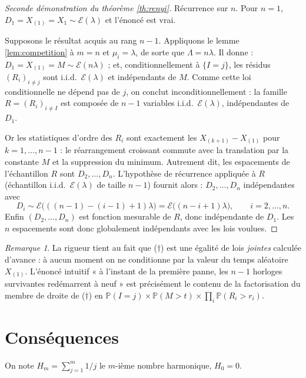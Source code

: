 \documentclass[11pt,a4paper]{article}
\theoremstyle{plain}
\theoremstyle{definition}
\theoremstyle{remark}
\newtheorem{remarque}[theoreme]{Remarque}
\newcommand{\Prob}{\mathbb{P}}
\newcommand{\Expo}{\mathcal{E}}
\newcommand{\Xord}[1]{X_{(#1)}}
\begin{document}
\begin{proof}[Seconde démonstration du théorème \ref{th:renyi}]
Récurrence sur $n$. Pour $n=1$, $D_1=X_{(1)}=X_1\sim\Expo(\lambda)$ et l'énoncé
est vrai.

Supposons le résultat acquis au rang $n-1$. Appliquons le lemme
\ref{lem:competition} à $m=n$ et $\mu_i=\lambda$, de sorte que $\Lambda=n\lambda$.
Il donne : $D_1=\Xord1=M\sim\Expo(n\lambda)$ ; et, conditionnellement à
$\{I=j\}$, les résidus $(R_i)_{i\ne j}$ sont i.i.d.\ $\Expo(\lambda)$ et
indépendants de $M$. Comme cette loi conditionnelle ne dépend pas de $j$, on
conclut inconditionnellement : la famille $R=(R_i)_{i\ne I}$ est composée de
$n-1$ variables i.i.d.\ $\Expo(\lambda)$, indépendantes de $D_1$.

Or les statistiques d'ordre des $R_i$ sont exactement les
$\Xord{k+1}-\Xord1$ pour $k=1,\dots,n-1$ : le réarrangement croissant commute
avec la translation par la constante $M$ et la suppression du minimum.
Autrement dit, les espacements de l'échantillon $R$ sont $D_2,\dots,D_n$.
L'hypothèse de récurrence appliquée à $R$ (échantillon i.i.d.\ $\Expo(\lambda)$
de taille $n-1$) fournit alors : $D_2,\dots,D_n$ indépendantes avec
\[
D_{i}\sim\Expo\bigl(((n-1)-(i-1)+1)\lambda\bigr)=\Expo\bigl((n-i+1)\lambda\bigr),
\qquad i=2,\dots,n .
\]
Enfin $(D_2,\dots,D_n)$ est fonction mesurable de $R$, donc indépendante de
$D_1$. Les $n$ espacements sont donc globalement indépendants avec les lois
voulues.
\end{proof}

\begin{remarque}
La rigueur tient au fait que ($\dagger$) est une égalité de lois \emph{jointes}
calculée d'avance : à aucun moment on ne conditionne par la valeur du temps
aléatoire $\Xord1$. L'énoncé intuitif « à l'instant de la première panne, les
$n-1$ horloges survivantes redémarrent à neuf » est précisément le contenu de la
factorisation du membre de droite de ($\dagger$) en
$\Prob(I=j)\times\Prob(M>t)\times\prod_i\Prob(R_i>r_i)$.
\end{remarque}

\section{Conséquences}

On note $H_m=\sum_{j=1}^m 1/j$ le $m$-ième nombre harmonique, $H_0=0$.
\end{document}
